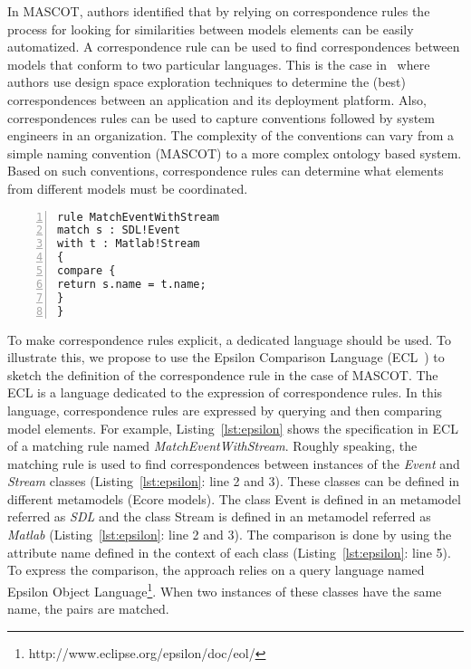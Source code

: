 In MASCOT, authors identified that by relying on correspondence rules the process for looking for similarities between models elements can be easily automatized. %
A correspondence rule can be used to find correspondences between models that conform to two particular languages. This is the case in~\cite{kofmanbib} where authors use design space exploration techniques to determine the (best) correspondences between an application and its deployment platform. Also, correspondences rules can be used to capture conventions followed by system engineers in an organization. The complexity of the conventions can vary from a simple naming convention (\eg MASCOT) to a more complex ontology based system. Based on such conventions, correspondence rules can determine what elements from different models must be coordinated.    

\begin{lstlisting}[language=epsilon, caption={The Mascot correspondence rule in the Epsilon Comparison Language}, label={lst:epsilon}, 	basicstyle=\scriptsize\ttfamily, backgroundcolor=\color{LGrey}, numbers=left, xleftmargin=2pt]
rule MatchEventWithStream
match s : SDL!Event
with t : Matlab!Stream 
{
compare {
return s.name = t.name;
}
}
\end{lstlisting}

To make correspondence rules explicit, a dedicated language should be used. To illustrate this, we propose to use the Epsilon Comparison Language (ECL~\cite{epsilonbib}) to sketch the definition of the correspondence rule in the case of MASCOT. The ECL is a language dedicated to the expression of correspondence rules. In this language, correspondence rules are expressed by querying and then comparing model elements. For example, Listing~\ref{lst:epsilon} shows the specification in ECL of a matching rule named \emph{MatchEventWithStream}. Roughly speaking, the matching rule is used to find correspondences between instances of the \emph{Event} and \emph{Stream} classes (Listing~\ref{lst:epsilon}: line 2 and 3). These classes can be defined in different metamodels (\ie Ecore models). The class Event is defined in an metamodel referred as \emph{SDL} and the class Stream is defined in an metamodel referred as \emph{Matlab} (Listing~\ref{lst:epsilon}: line 2 and 3). The comparison is done by using the attribute name defined in the context of each class (Listing~\ref{lst:epsilon}: line 5). To express the comparison, the approach relies on a query language named Epsilon Object Language\footnote{http://www.eclipse.org/epsilon/doc/eol/}. When two instances of these classes have the same name, the pairs are matched.

